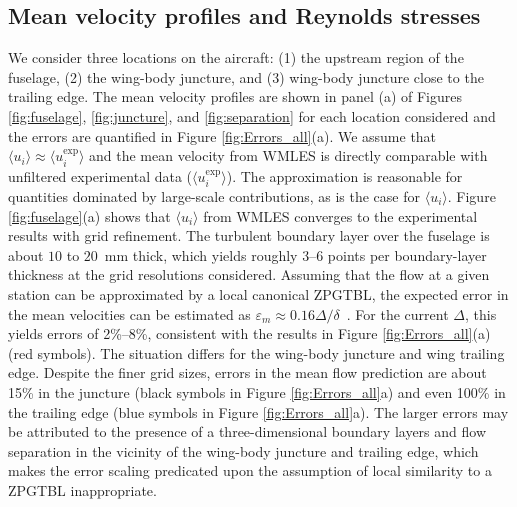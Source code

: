 \documentclass{ctr}
\begin{document}
\subsection{Mean velocity profiles and Reynolds stresses}
\label{subsec:vel_stress}

We consider three locations on the aircraft: (1) the upstream region
of the fuselage, (2) the wing-body juncture, and (3) wing-body
juncture close to the trailing edge.  The mean velocity profiles are
shown in panel (a) of Figures \ref{fig:fuselage}, \ref{fig:juncture},
and \ref{fig:separation} for each location considered and the errors
are quantified in Figure \ref{fig:Errors_all}(a). We assume that
$\langle u_i \rangle \approx \langle u_i^{\mathrm{exp}} \rangle$ and
the mean velocity from WMLES is directly comparable with unfiltered
experimental data ($\langle u_i^{\mathrm{exp}} \rangle$). The
approximation is reasonable for quantities dominated by large-scale
contributions, as is the case for $\langle u_i \rangle$.  Figure
\ref{fig:fuselage}(a) shows that $\langle u_i \rangle$ from WMLES
converges to the experimental results with grid refinement.  The
turbulent boundary layer over the fuselage is about $10$ to $20$~mm
thick, which yields roughly 3--6 points per boundary-layer thickness
at the grid resolutions considered.  Assuming that the flow at a given
station can be approximated by a local canonical ZPGTBL, the expected
error in the mean velocities can be estimated as $\varepsilon_m
\approx 0.16 \Delta/\delta$~\citep{Lozano2019a}. For the current
$\Delta$, this yields errors of 2\%--8\%, consistent with the results
in Figure \ref{fig:Errors_all}(a) (red symbols).  The situation
differs for the wing-body juncture and wing trailing edge. Despite the
finer grid sizes, errors in the mean flow prediction are about 15\% in
the juncture (black symbols in Figure \ref{fig:Errors_all}a) and even
100\% in the trailing edge (blue symbols in Figure
\ref{fig:Errors_all}a).  The larger errors may be attributed to the
presence of a three-dimensional boundary layers and flow separation in
the vicinity of the wing-body juncture and trailing edge, which makes
the error scaling predicated upon the assumption of local similarity
to a ZPGTBL inappropriate.
%
\end{document}
